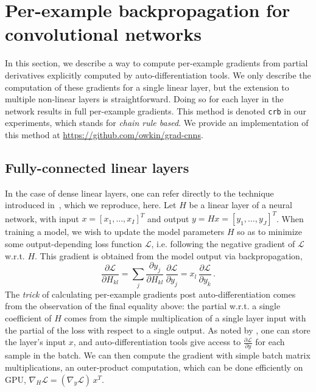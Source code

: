 \documentclass[11pt]{article}
\begin{document}
\section{Per-example backpropagation for convolutional networks}

In this section, we describe a way to compute per-example gradients from
partial derivatives explicitly computed by auto-differentiation tools. We
only describe the computation of these gradients for a single linear layer, but
the extension to multiple non-linear layers is straightforward. Doing so
for each layer in the network results in full per-example gradients.
%
This method is denoted \texttt{crb} in our experiments, which stands for
\emph{chain rule based}. We provide an implementation of this
method at \url{https://github.com/owkin/grad-cnns}.

\subsection{Fully-connected linear layers}
%
In the case of dense linear layers, one can refer directly to the 
technique introduced in~\cite{goodfellow2015efficient}, which we
reproduce, here.
Let $H$ be a linear layer of a neural network, with input $x = \left[ x_1,
\hdots, x_I \right]^T$ and output $y = Hx = \left[ y_1, \hdots, y_J
\right]^T$. When training a model, we wish to update the model parameters
$H$ so as to minimize some output-depending loss function $\mathcal{L}$, i.e.
following the negative gradient of $\mathcal{L}$ w.r.t. $H$.
This gradient is obtained from the model output via backpropagation,
\begin{equation}
    \frac{\partial \mathcal L}{\partial H_{kl}}
    = \sum_j \frac{\partial y_j}{\partial H_{kl}} \,\frac{\partial \mathcal L}{\partial y_j}
    = x_l \, \frac{\partial \mathcal L}{\partial y_k} \, .
\end{equation}
The \emph{trick} of calculating per-example gradients post auto-differentiation
comes from the observation of the final equality above: the partial w.r.t. a single coefficient
of $H$ comes from the simple multiplication of a single layer input with the partial
of the loss with respect to a single output. 
As noted by \cite{goodfellow2015efficient}, one can store the layer's input
$x$, and auto-differentiation tools give access to $\frac{\partial \mathcal
L}{\partial y}$ for each sample in the batch. We can then compute the
gradient with simple batch matrix multiplications, an outer-product computation,
which can be done efficiently on GPU, $\nabla_H\mathcal{L} = (\nabla_y\mathcal{L})\, x^T$.
\end{document}
